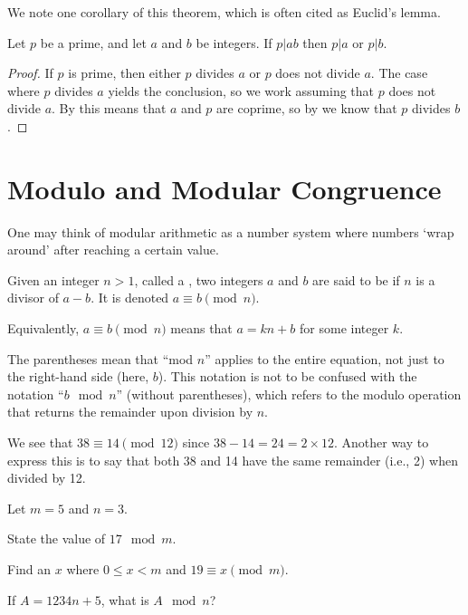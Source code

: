 We note one corollary of this theorem, which is often cited as Euclid's lemma.

\begin{corollary}\label{corollary-euclid}
    Let $p$ be a prime, and let $a$ and $b$ be integers. If $p \vert ab$ then $p \vert a$ or $p \vert b$.
\end{corollary}
\begin{proof}
    If $p$ is prime, then either $p$ divides $a$ or $p$ does not divide $a$. The case where $p$ divides $a$ yields the conclusion, so we work assuming that $p$ does not divide $a$. By  this means that $a$ and $p$ are coprime, so by  we know that $p$ divides $b$.
\end{proof}

\section{Modulo and Modular Congruence}
One may think of modular arithmetic as a number system where numbers `wrap around' after reaching a certain value.

\begin{definition}
    Given an integer $n>1$, called a , two integers $a$ and $b$ are said to be  if $n$ is a divisor of $a - b$. It is denoted $a \equiv b \pmod{n}$.
\end{definition}
\begin{remark}
    Equivalently, $a \equiv b \pmod n$ means that $a = kn + b$ for some integer $k$.
\end{remark}
\begin{remark}
    The parentheses mean that ``mod $n$'' applies to the entire equation, not just to the right-hand side (here, $b$). This notation is not to be confused with the notation ``$b \mod n$'' (without parentheses), which refers to the modulo operation that returns the remainder upon division by $n$.
\end{remark}

\begin{example}
    We see that $38 \equiv 14 \pmod{12}$ since $38 - 14 = 24 = 2 \times 12$. Another way to express this is to say that both 38 and 14 have the same remainder (i.e., 2) when divided by 12.
\end{example}

\begin{exercise}
    Let $m = 5$ and $n = 3$.
    \begin{partquestions}{\alph*}
        \item State the value of $17 \mod m$.
        \item Find an $x$ where $0 \leq x < m$ and $19 \equiv x \pmod m$.
        \item If $A = 1234n + 5$, what is $A \mod n$?
    \end{partquestions}
\end{exercise}

